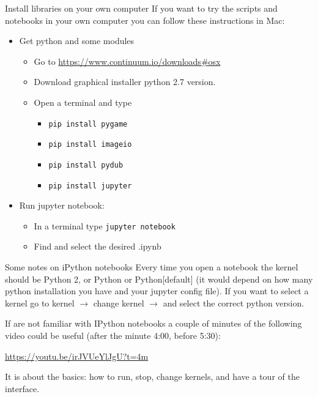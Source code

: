 \documentclass{beamer}
\begin{document}
\begin{frame}{Install libraries on your own computer}
If you want to try the scripts and notebooks in your own computer you can follow these instructions in Mac:
\begin{itemize}
   \item Get python and some modules
   \begin{itemize}
      \item Go to \href{https://www.continuum.io/downloads\#osx}{https://www.continuum.io/downloads\#osx}
      \item Download graphical installer python 2.7 version.
      \item Open a terminal and type
      \begin{itemize}
         \item \texttt{pip install pygame}
         \item \texttt{pip install imageio}
         \item \texttt{pip install pydub}
         \item \texttt{pip install jupyter}
      \end{itemize}
   \end{itemize}
   \item Run jupyter notebook:
   \begin{itemize}
      \item In a terminal type \texttt{jupyter notebook}
      \item Find and select the desired .ipynb
   \end{itemize}
\end{itemize}
\end{frame}

\begin{frame}{Some notes on iPython notebooks}
Every time you open a notebook the kernel should be Python 2, or Python or Python[default] (it would depend on how many python installation you have and your jupyter config file). If you want to select a kernel go to kernel $\rightarrow$ change kernel $\rightarrow$ and select the correct python version.

If are not familiar with IPython notebooks a couple of minutes of the following video could be useful (after the minute 4:00, before 5:30):
\begin{center}
   \href{https://youtu.be/irJVUeYlJgU?t=4m}{https://youtu.be/irJVUeYlJgU?t=4m}
\end{center}
It is about the basics: how to run, stop, change kernels, and have a tour of the interface.
\end{frame}
\end{document}
